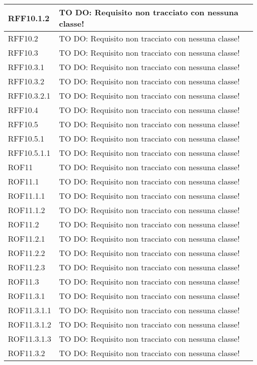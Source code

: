 \begin{center}
\begin{longtable}{| p{4cm} | p{8cm} |}
\hline
RFF10.1.2 & TO DO: Requisito non tracciato con nessuna classe! \\
\hline
RFF10.2 & TO DO: Requisito non tracciato con nessuna classe! \\
\hline
RFF10.3 & TO DO: Requisito non tracciato con nessuna classe! \\
\hline
RFF10.3.1 & TO DO: Requisito non tracciato con nessuna classe! \\
\hline
RFF10.3.2 & TO DO: Requisito non tracciato con nessuna classe! \\
\hline
RFF10.3.2.1 & TO DO: Requisito non tracciato con nessuna classe! \\
\hline
RFF10.4 & TO DO: Requisito non tracciato con nessuna classe! \\
\hline
RFF10.5 & TO DO: Requisito non tracciato con nessuna classe! \\
\hline
RFF10.5.1 & TO DO: Requisito non tracciato con nessuna classe! \\
\hline
RFF10.5.1.1 & TO DO: Requisito non tracciato con nessuna classe! \\
\hline
ROF11 & TO DO: Requisito non tracciato con nessuna classe! \\
\hline
ROF11.1 & TO DO: Requisito non tracciato con nessuna classe! \\
\hline
ROF11.1.1 & TO DO: Requisito non tracciato con nessuna classe! \\
\hline
ROF11.1.2 & TO DO: Requisito non tracciato con nessuna classe! \\
\hline
ROF11.2 & TO DO: Requisito non tracciato con nessuna classe! \\
\hline
ROF11.2.1 & TO DO: Requisito non tracciato con nessuna classe! \\
\hline
ROF11.2.2 & TO DO: Requisito non tracciato con nessuna classe! \\
\hline
ROF11.2.3 & TO DO: Requisito non tracciato con nessuna classe! \\
\hline
ROF11.3 & TO DO: Requisito non tracciato con nessuna classe! \\
\hline
ROF11.3.1 & TO DO: Requisito non tracciato con nessuna classe! \\
\hline
ROF11.3.1.1 & TO DO: Requisito non tracciato con nessuna classe! \\
\hline
ROF11.3.1.2 & TO DO: Requisito non tracciato con nessuna classe! \\
\hline
ROF11.3.1.3 & TO DO: Requisito non tracciato con nessuna classe! \\
\hline
ROF11.3.2 & TO DO: Requisito non tracciato con nessuna classe! \\

\end{longtable}
\end{center}
